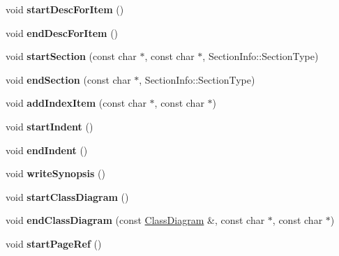 \begin{DoxyCompactItemize}
void {\bfseries start\+Desc\+For\+Item} ()
\item 
\mbox{\label{class_latex_generator_a435efc951be4e6d166b4658a34d8b810}} 
void {\bfseries end\+Desc\+For\+Item} ()
\item 
\mbox{\label{class_latex_generator_a93e679ac80ca24f50f72fefa51e7d98e}} 
void {\bfseries start\+Section} (const char $\ast$, const char $\ast$, Section\+Info\+::\+Section\+Type)
\item 
\mbox{\label{class_latex_generator_aec87e4e5a2e5f72924316fb20005903b}} 
void {\bfseries end\+Section} (const char $\ast$, Section\+Info\+::\+Section\+Type)
\item 
\mbox{\label{class_latex_generator_aabbdce121f41f32494aa03a28863840d}} 
void {\bfseries add\+Index\+Item} (const char $\ast$, const char $\ast$)
\item 
\mbox{\label{class_latex_generator_a74eea0dc8113265d289a01f7f59fcf39}} 
void {\bfseries start\+Indent} ()
\item 
\mbox{\label{class_latex_generator_a424ac60d3215a138bd4e50227c0e4445}} 
void {\bfseries end\+Indent} ()
\item 
\mbox{\label{class_latex_generator_aa53e33f421454ff463a11eb0b0a7afc5}} 
void {\bfseries write\+Synopsis} ()
\item 
\mbox{\label{class_latex_generator_aee32e115984402a2d4b49c4a7d153a53}} 
void {\bfseries start\+Class\+Diagram} ()
\item 
\mbox{\label{class_latex_generator_a0225710e54247e934ce69e8d009979e3}} 
void {\bfseries end\+Class\+Diagram} (const \mbox{\hyperlink{class_class_diagram}{Class\+Diagram}} \&, const char $\ast$, const char $\ast$)
\item 
\mbox{\label{class_latex_generator_a06e41ed1bb67b71516bed656ea2f2243}} 
void {\bfseries start\+Page\+Ref} ()
\item 
\mbox{\label{class_latex_generator_ad2f1a929d3e6a97c1e521184f03961c9}} 

\end{DoxyCompactItemize}
